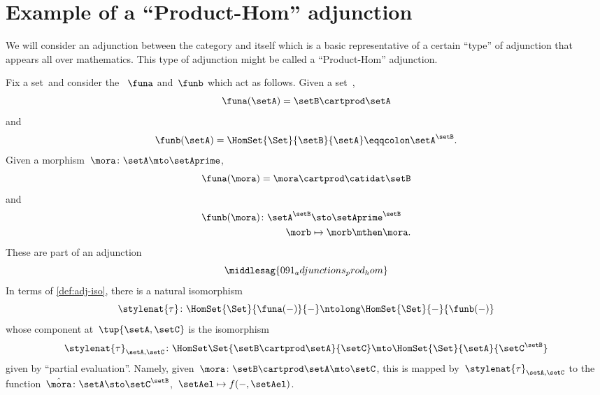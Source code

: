 
\section[Product-Hom adjunction]{Example of a ``Product-Hom'' adjunction}
We will consider an adjunction between the category \Set and itself which is a basic representative of a certain ``type'' of adjunction that appears all over mathematics.
This type of adjunction might be called a ``Product-Hom'' adjunction.

Fix a set~\setB and consider the ~$\funa$ and~$\funb$ which act as follows.
Given a set~\setA,
\begin{equation}
    \funa(\setA) = \setB \cartprod \setA
\end{equation}
and
\begin{equation}
    \funb(\setA) = \HomSet{\Set}{\setB}{\setA} \eqqcolon \setA^\setB.
\end{equation}
Given a morphism~$\mora\colon \setA \mto \setAprime$,
\begin{equation}
    \funa(\mora) = \mora \cartprod \catidat\setB
\end{equation}
and
\begin{equation}
    \begin{aligned}
        \funb(\mora)\colon \setA^\setB & \sto \setAprime^\setB \\
        \morb                          & \mapsto \morb \mthen \mora.
    \end{aligned}
\end{equation}
%
These  are part of an adjunction
%
\begin{equation}
    \middlesag{091_adjunctions_prod_hom}
\end{equation}
In terms of \cref{def:adj-iso}, there is a natural isomorphism
\begin{equation}
    \stylenat{\tau}\colon \HomSet{\Set}{\funa(- )}{-}  \ntolong   \HomSet{\Set}{-}{\funb( - )}
\end{equation}
whose component at~$\tup{\setA,\setC}$ is the isomorphism
\begin{equation}
    \stylenat{\tau}_{\setA,\setC} \colon \HomSet\Set{\setB\cartprod \setA}{\setC} \mto \HomSet{\Set}{\setA}{\setC^\setB}
\end{equation}
given by ``partial evaluation''.
Namely, given~$\mora \colon \setB \cartprod \setA \mto \setC$, this is mapped by~$\stylenat{\tau}_{\setA,\setC}$ to the function~$\hat \mora \colon \setA \sto \setC^\setB$,~$\setAel \mapsto f( -, \setAel)$.

